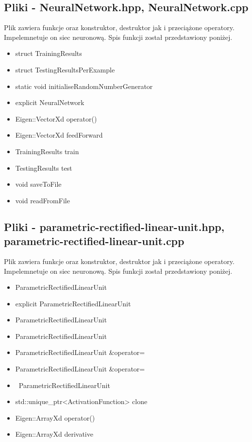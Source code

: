 \documentclass{classrep}
\begin{document}
{        \subsection{Pliki - NeuralNetwork.hpp, NeuralNetwork.cpp}
        {
            Plik zawiera funkcje oraz konstruktor, destruktor jak i przeciążone operatory.
            Impelemnetuje on siec neuronową.
            Spis funkcji został przedstawiony poniżej.
            \begin{itemize}
                \item struct TrainingResults
                \item struct TestingResultsPerExample
                \item static void initialiseRandomNumberGenerator
                \item explicit NeuralNetwork
                \item Eigen::VectorXd operator()
                \item Eigen::VectorXd feedForward
                \item TrainingResults train
                \item TestingResults test
                \item void saveToFile
                \item void readFromFile
            \end{itemize}
        }

        \subsection{Pliki - parametric-rectified-linear-unit.hpp, parametric-rectified-linear-unit.cpp}
        {
            Plik zawiera funkcje oraz konstruktor, destruktor jak i przeciążone operatory.
            Impelemnetuje on siec neuronową.
            Spis funkcji został przedstawiony poniżej.
            \begin{itemize}
                \item ParametricRectifiedLinearUnit
                \item explicit ParametricRectifiedLinearUnit
                \item ParametricRectifiedLinearUnit
                \item ParametricRectifiedLinearUnit
                \item ParametricRectifiedLinearUnit \&operator=
                \item ParametricRectifiedLinearUnit \&operator=
                \item ~ParametricRectifiedLinearUnit
                \item std::unique\_ptr<ActivationFunction> clone
                \item Eigen::ArrayXd operator()
                \item Eigen::ArrayXd derivative
            \end{itemize}
        }

}
\end{document}
